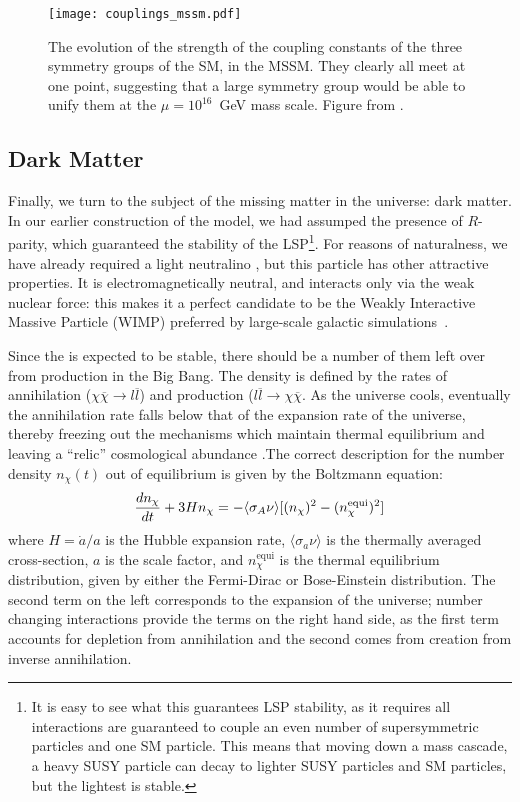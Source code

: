 
\begin{figure}
\centering
\texttt{[image: couplings\_mssm.pdf]}
\label{fig:susy:couplings_mssm}
\caption{The evolution of the strength of the coupling constants of the three symmetry groups of the SM, in the MSSM. They clearly all meet at one point, suggesting that a large symmetry group would be able to unify them at the $\mu = 10^{16}$~GeV mass scale. Figure from \cite{susypheno}.}
\end{figure}


\subsection{Dark Matter}

Finally, we turn to the subject of the missing matter in the universe: dark matter. In our earlier construction of the model, we had assumped the presence of $R$-parity, which guaranteed the stability of the LSP\footnote{It is easy to see what this guarantees LSP stability, as it requires all interactions are guaranteed to couple an even number of supersymmetric particles and one SM particle. This means that moving down a mass cascade, a heavy SUSY particle can decay to lighter SUSY particles and SM particles, but the lightest is stable.}. For reasons of naturalness, we have already required a light neutralino \lsp, but this particle has other attractive properties. It is electromagnetically neutral, and interacts only via the weak nuclear force: this makes it a perfect candidate to be the Weakly Interactive Massive Particle (WIMP) preferred by large-scale galactic simulations~\cite{Goldberg:1983nd,Ellis:1983ew,Jungman}.

Since the \lsp is expected to be stable, there should be a number of them left over from production in the Big Bang. The density is defined by the rates of annihilation ($\chi\overline{\chi} \rightarrow l \overline{l}$) and production ($l\overline{l}\rightarrow \chi\overline{\chi}$. As the universe cools, eventually the annihilation rate falls below that of the expansion rate of the universe, thereby freezing out the mechanisms which maintain thermal equilibrium and leaving a ``relic'' cosmological abundance \cite{Jungman}.The correct description for the number density $n_\chi(t)$ out of equilibrium is given by the Boltzmann equation:
\begin{align}
  \frac{d n_\chi}{d t} + 3 H n_\chi = - \langle \sigma_A \nu \rangle [(n_\chi)^2 - (n_\chi^\mathrm{equi})^2]\label{eqn:boltz}
\end{align}
where $H=\dot{a}/a$ is the Hubble expansion rate, $\langle\sigma_a \nu\rangle$ is the thermally averaged cross-section, $a$ is the scale factor, and $n_\chi^\mathrm{equi}$ is the thermal equilibrium distribution, given by either the Fermi-Dirac or Bose-Einstein distribution. The second term on the left corresponds to the expansion of the universe; number changing interactions provide the terms on the right hand side, as the first term accounts for depletion from annihilation and the second comes from creation from inverse annihilation. 

